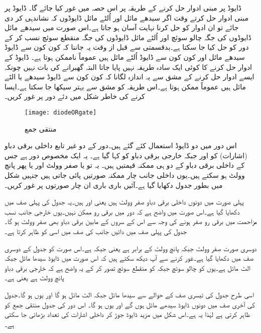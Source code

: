  ڈایوڈ پر مبنی ادوار حل کرنے کے طریقہ پر اس حصہ میں غور کیا جائے گا۔ ڈایوڈ پر مبنی ادوار حل کرتے وقت اگر سیدھے مائل اور اُلٹے مائل ڈایوڈوں  کہ نشاندہی کر دی جائے تو ان ادوار کو حل کرنا نہایت آسان ہو جاتا ہے۔اس صورت میں سیدھے مائل ڈایوڈوں کی جگہ چالو سوئچ اور اُلٹے مائل ڈایوڈوں  کی جگہ منقطع سوئچ نسب کر کے دور کو حل کیا جا سکتا ہے۔بدقسمتی سے قبل از وقت یہ جاننا کہ کون کون سے ڈایوڈ سیدھے مائل اور کون کون سے ڈایوڈ  اُلٹے مائل ہیں عموماً ناممکن ہوتا ہے۔ ڈایوڈ کے ادوار حل کرنے کا کوئی ایک سادہ طریقہ نہیں پایا جاتا البتہ گھبرانے کی بات نہیں چونکہ ایسے ادوار حل کرنے کے مشق سے یہ اندازہ لگانا کہ کون کون سے ڈایوڈ سیدھے یا الٹے مائل ہیں عموماً ممکن ہوتا ہے۔اس طریقہ کو مشق سے بہتر سیکھا جا سکتا ہے۔ایسا کرنے کی خاطر شکل  میں دئے دور پر غور کریں۔
\begin{figure}
\centering
\texttt{[image: diodeORgate]}
\caption{منتقی جمع}
\label{شکل_منتقی_جمع}
\end{figure}

اس دور میں دو ڈایوڈ استعمال کئے گئے ہیں۔دور کے دو غیر تابع داخلی برقی دباو (اشارات) کو  اور  جبکہ خارجی برقی دباو کو  کہا گیا ہے۔ یہ ایک مخصوص دور ہے جس کے داخلی برقی دباو کے دو ہی ممکنہ قیمتیں ہیں۔ یہ تو یا صفر وولٹ    اور یا پھر پانچ وولٹ   ہو سکتے ہیں۔یوں داخلی جانب چار ممکنہ صورتیں پائی جاتی ہیں جنہیں شکل میں بطور جدول  دکھایا گیا ہے۔آئیں باری باری ان چار صورتوں پر غور کریں۔

پہلی صورت میں دونوں داخلی برقی دباو صفر وولٹ ہیں یعنی  اور  ہیں۔یہ جدول کی پہلی صف میں دکھایا گیا ہے۔اس صورت میں واضح ہے کہ دور میں برقی رو ممکن نہیں۔یوں خارجی جانب نسب مزاحمت میں برقی رو صفر ہونے کی وجہ سے اس کے سروں کے مابین برقی دباو بھی صفر وولٹ ہو گا۔جدول کی پہلی صف میں دائیں جانب  کی صف میں  اسی کو ظاہر کرتا ہے۔

دوسری صورت   صفر وولٹ جبکہ   پانچ وولٹ کے برابر ہے یعنی  جبکہ  ہے۔اس صورت کو جدول کے دوسری صف میں دکھایا گیا ہے۔غور کرنے سے آپ دیکھ سکتے ہیں کہ اس صورت میں ڈایوڈ  سیدھا مائل جبکہ  الٹ مائل ہے۔یوں   کو چالو سوئچ جبکہ  کو منقطع سوئچ تصور کر کے یہ واضح ہے کہ خارجی برقی دباو پانچ وولٹ ہے یعنی   ہے۔

	اسی طرح جدول کی تیسری صف کے حوالے سے  سیدھا مائل جبکہ  الٹ مائل ہو گا اور یوں  ہو گا۔جدول کی آخری صف  میں دونوں ڈایوڈ سیدھے مائل ہوں گے اور یوں  ہو گا۔
	اس دور کی جدول منتقی جمع کو ظاہر کرتی ہے لہٰذا یہ    ہے۔اس شکل میں مزید  ڈایوڈ جوڑ کر داخلی اشارات کی تعداد بڑھائی جا سکتی ہے۔ 


